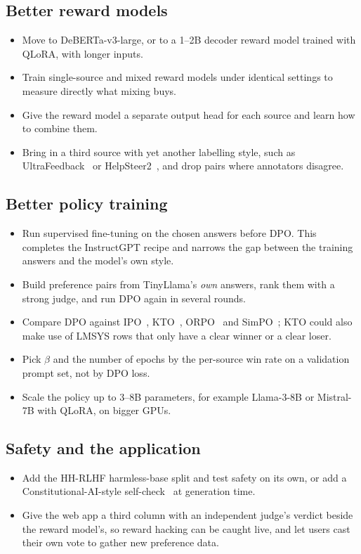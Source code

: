 \subsection{Better reward models}
\begin{itemize}
  \item Move to DeBERTa-v3-large, or to a 1--2B decoder reward model trained with QLoRA, with longer inputs.
  \item Train single-source and mixed reward models under identical settings to measure directly what mixing buys.
  \item Give the reward model a separate output head for each source and learn how to combine them.
  \item Bring in a third source with yet another labelling style, such as UltraFeedback~\cite{cui2023ultrafeedback} or HelpSteer2~\cite{wang2024helpsteer2}, and drop pairs where annotators disagree.
\end{itemize}

\subsection{Better policy training}
\begin{itemize}
  \item Run supervised fine-tuning on the chosen answers before DPO. This completes the InstructGPT recipe and narrows the gap between the training answers and the model's own style.
  \item Build preference pairs from TinyLlama's \emph{own} answers, rank them with a strong judge, and run DPO again in several rounds.
  \item Compare DPO against IPO~\cite{azar2024ipo}, KTO~\cite{ethayarajh2024kto}, ORPO~\cite{hong2024orpo} and SimPO~\cite{meng2024simpo}; KTO could also make use of LMSYS rows that only have a clear winner or a clear loser.
  \item Pick $\beta$ and the number of epochs by the per-source win rate on a validation prompt set, not by DPO loss.
  \item Scale the policy up to 3--8B parameters, for example Llama-3-8B or Mistral-7B with QLoRA, on bigger GPUs.
\end{itemize}

\subsection{Safety and the application}
\begin{itemize}
  \item Add the HH-RLHF harmless-base split and test safety on its own, or add a Constitutional-AI-style self-check~\cite{bai2022cai} at generation time.
  \item Give the web app a third column with an independent judge's verdict beside the reward model's, so reward hacking can be caught live, and let users cast their own vote to gather new preference data.
\end{itemize}

